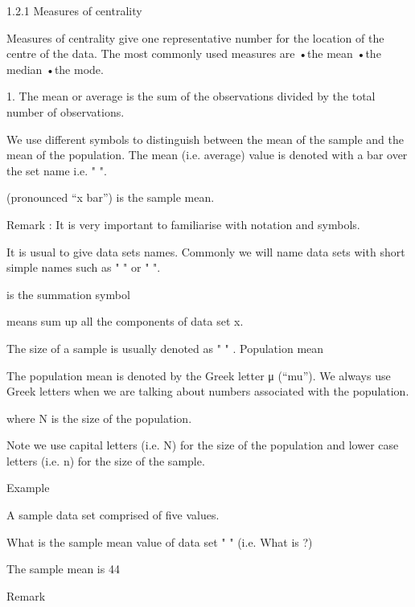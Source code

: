 \documentclass[]{report}
\begin{document}
1.2.1 Measures of centrality

Measures of centrality give one representative number for the location of the centre of the data. 
The most commonly used measures are 
•the mean
•the median
•the mode.

1.    The mean or average is the sum of the observations divided by the total number of observations.

We use different symbols to distinguish between the mean of the sample and the mean of the population.
The mean (i.e. average) value is denoted with a bar over the set name i.e. " ".


      (pronounced “x bar”)  is the sample mean.


    


Remark : It is very important to familiarise with notation and symbols.

It is usual to give data sets names.  Commonly we will name data sets with short simple names such as " " or  " ".

 
   is the summation symbol
 
 
    means sum up all the components of data set x.
 
The size of a sample is usually denoted as " "  . 
Population mean

 
The population mean is denoted by the Greek letter μ  (“mu”). We always use Greek letters when we are talking about numbers associated with the population.
 
            
where N is the size of the population.

Note we use capital letters (i.e. N) for the size of the population and lower case letters  (i.e. n) for the size of the sample.

Example


A sample data set  comprised of five values.          
 
     
 
What is the sample mean value of data set " " (i.e. What is   ?)
 
           
 
 The sample mean is 44


Remark 
 
\end{document}
